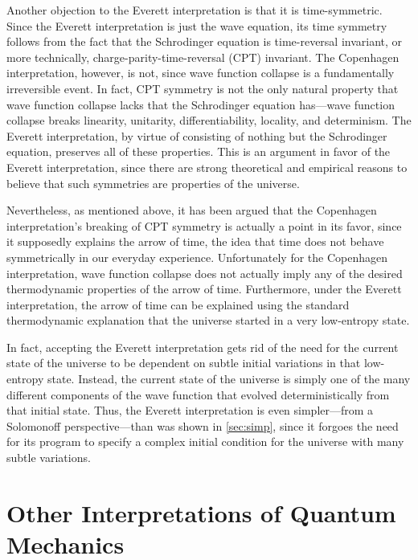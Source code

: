 \documentclass[
    12pt,
    letterpaper,
    aps,
    prd,
    longbibliography,
    twocolumn,
    nofootinbib,
    raggedbottom,
    amsmath,
    amssymb,
    amsfonts,
]{revtex4-1}
\begin{document}
Another objection to the Everett interpretation is that it is time-symmetric. Since the Everett interpretation is just the wave equation, its time symmetry follows from the fact that the Schrodinger equation is time-reversal invariant, or more technically, charge-parity-time-reversal (CPT) invariant. The Copenhagen interpretation, however, is not, since wave function collapse is a fundamentally irreversible event.\cite{time} In fact, CPT symmetry is not the only natural property that wave function collapse lacks that the Schrodinger equation has---wave function collapse breaks linearity, unitarity, differentiability, locality, and determinism.\cite{wallacebook}\cite{manyworldsbook}\cite{faq}\cite{lesswrongcollapse} The Everett interpretation, by virtue of consisting of nothing but the Schrodinger equation, preserves all of these properties. This is an argument in favor of the Everett interpretation, since there are strong theoretical and empirical reasons to believe that such symmetries are properties of the universe.\cite{quantumviolation}\cite{cptsym}\cite{linearity}\cite{townsend}

Nevertheless, as mentioned above, it has been argued that the Copenhagen interpretation's breaking of CPT symmetry is actually a point in its favor, since it supposedly explains the arrow of time, the idea that time does not behave symmetrically in our everyday experience.\cite{time} Unfortunately for the Copenhagen interpretation, wave function collapse does not actually imply any of the desired thermodynamic properties of the arrow of time.\cite{time} Furthermore, under the Everett interpretation, the arrow of time can be explained using the standard thermodynamic explanation that the universe started in a very low-entropy state.\cite{arrowoftime}

In fact, accepting the Everett interpretation gets rid of the need for the current state of the universe to be dependent on subtle initial variations in that low-entropy state.\cite{arrowoftime} Instead, the current state of the universe is simply one of the many different components of the wave function that evolved deterministically from that initial state. Thus, the Everett interpretation is even simpler---from a Solomonoff perspective---than was shown in \autoref{sec:simp}, since it forgoes the need for its program to specify a complex initial condition for the universe with many subtle variations.

\section{Other Interpretations of Quantum Mechanics}
\label{sec:alts}
\end{document}
